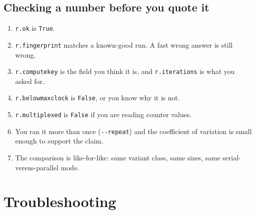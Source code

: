 \documentclass[11pt,a4paper]{article}
\newcommand{\code}[1]{\texttt{\let\_\breakableunderscore #1}}
\newcommand{\breakableunderscore}{\textunderscore\allowbreak}
\begin{document}
\subsection{Checking a number before you quote it}

\begin{enumerate}[leftmargin=0.8cm]
  \item \code{r.ok} is \code{True}.
  \item \code{r.fingerprint} matches a known-good run. A fast wrong answer is
    still wrong.
  \item \code{r.compute\_key} is the field you think it is, and
    \code{r.iterations} is what you asked for.
  \item \code{r.below\_max\_clock} is \code{False}, or you know why it is not.
  \item \code{r.multiplexed} is \code{False} if you are reading counter values.
  \item You ran it more than once (\code{-{}-repeat}) and the coefficient of
    variation is small enough to support the claim.
  \item The comparison is like-for-like: same variant class, same sizes, same
    serial-versus-parallel mode.
\end{enumerate}

\section{Troubleshooting}
\end{document}
